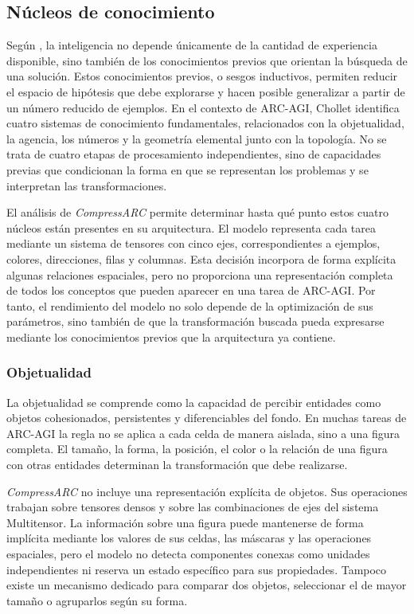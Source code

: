 \documentclass[11pt,a4paper,spanish]{book}
\numberwithin{equation}{chapter}
\numberwithin{figure}{chapter}
\begin{document}
\subsection{Núcleos de conocimiento}

Según , la inteligencia no depende únicamente de la cantidad de experiencia disponible, sino también de los
conocimientos previos que orientan la búsqueda de una solución. Estos conocimientos previos, o sesgos inductivos, permiten reducir el
espacio de hipótesis que debe explorarse y hacen posible generalizar a partir de un número reducido de ejemplos. En el contexto de
ARC-AGI, Chollet identifica cuatro sistemas de conocimiento fundamentales, relacionados con la objetualidad, la agencia, los números
y la geometría elemental junto con la topología. No se trata de cuatro etapas de procesamiento independientes, sino de capacidades
previas que condicionan la forma en que se representan los problemas y se interpretan las transformaciones.

El análisis de \textit{CompressARC} permite determinar hasta qué punto estos cuatro núcleos están presentes en su arquitectura. El modelo
representa cada tarea mediante un sistema de tensores con cinco ejes, correspondientes a ejemplos, colores, direcciones, filas y
columnas. Esta decisión incorpora de forma explícita algunas relaciones espaciales, pero no proporciona una representación completa
de todos los conceptos que pueden aparecer en una tarea de ARC-AGI. Por tanto, el rendimiento del modelo no solo depende de la
optimización de sus parámetros, sino también de que la transformación buscada pueda expresarse mediante los conocimientos previos
que la arquitectura ya contiene.

\subsubsection{Objetualidad}

La objetualidad  se comprende como la capacidad de percibir entidades como objetos
cohesionados, persistentes y diferenciables del fondo. En muchas tareas de ARC-AGI la regla no se aplica a cada celda de manera
aislada, sino a una figura completa. El tamaño, la forma, la posición, el color o la relación de una figura con otras entidades
determinan la transformación que debe realizarse.

\textit{CompressARC} no incluye una representación explícita de objetos. Sus operaciones trabajan sobre tensores densos y sobre las
combinaciones de ejes del sistema Multitensor. La información sobre una figura puede mantenerse de forma implícita mediante los
valores de sus celdas, las máscaras y las operaciones espaciales, pero el modelo no detecta componentes conexas como unidades
independientes ni reserva un estado específico para sus propiedades. Tampoco existe un mecanismo dedicado para comparar dos objetos,
seleccionar el de mayor tamaño o agruparlos según su forma.
\end{document}
